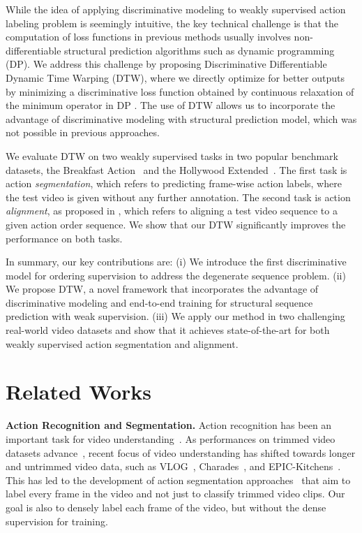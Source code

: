 \documentclass[10pt,twocolumn,letterpaper]{article}
\newcommand{\dttw}{DTW\xspace}
\begin{document}
While the idea of applying discriminative modeling to weakly supervised action labeling problem is seemingly intuitive, the key technical challenge is that the computation of loss functions in previous methods usually involves non-differentiable structural prediction algorithms such as dynamic programming (DP). We address this challenge by proposing Discriminative Differentiable Dynamic Time Warping (\dttw), where we directly optimize for better outputs by minimizing a discriminative loss function obtained by continuous relaxation of the minimum operator in DP \cite{mensch2018differentiable}. The use of \dttw allows us to incorporate the advantage of discriminative modeling with structural prediction model, which was not possible in previous approaches. 

We evaluate \dttw on two weakly supervised tasks in two popular benchmark datasets, the Breakfast Action~\cite{kuehne2014language} and the Hollywood Extended~\cite{bojanowski2014weakly}. The first task is action \emph{segmentation}, which refers to predicting frame-wise action labels, where the test video is given without any further annotation. The second task is action \emph{alignment}, as proposed in \cite{bojanowski2014weakly}, which refers to aligning a test video sequence to a given action order sequence.
We show that our \dttw significantly improves the performance on both tasks. 


In summary, our key contributions are: 
(i) We introduce the first discriminative model for ordering supervision to address the degenerate sequence problem. 
(ii) We propose \dttw, a novel framework that incorporates the advantage of discriminative modeling and end-to-end training for structural sequence prediction with weak supervision. 
(iii) We apply our method in two challenging real-world video datasets and show that it achieves state-of-the-art for both weakly supervised action segmentation and alignment. \section{Related Works}
\label{sec:relatedworks}

\noindent\textbf{Action Recognition and Segmentation.} 
Action recognition has been an important task for video understanding~\cite{heilbron2015activitynet,pirsiavash2014parsing,sener2015unsupervised,vo2014stochastic}. As performances on trimmed video datasets advance~\cite{heilbron2015activitynet,carreira2017quo}, recent focus of video understanding has shifted towards longer and untrimmed video data, such as VLOG~\cite{fouhey2018lifestyle}, Charades~\cite{sigurdsson2016hollywood}, and EPIC-Kitchens~\cite{Damen2018EPICKITCHENS}. This has led to the development of action segmentation approaches~\cite{lea2016temporal,sigurdsson2017asynchronous,yeung2015every} that aim to label every frame in the video and not just to classify trimmed video clips. Our goal is also to densely label each frame of the video, but without the dense supervision for training. 
\end{document}
